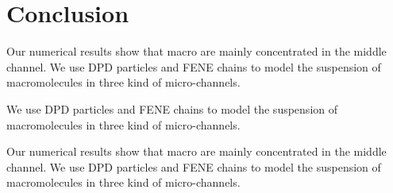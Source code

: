 \section{Conclusion}\label{conclusion}
Our numerical results show that macro are mainly concentrated in the middle channel. We use DPD particles and FENE chains to model the suspension of macromolecules in three kind of micro-channels. 

We use DPD particles and FENE chains to model the suspension of macromolecules in three kind of micro-channels. 

Our numerical results show that macro are mainly concentrated in the middle channel. We use DPD particles and FENE chains to model the suspension of macromolecules in three kind of micro-channels. 

